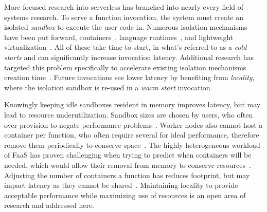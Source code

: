 More focused research into serverless has branched into nearly every field of systems research.
To serve a function invocation, the system must create an isolated \emph{sandbox} to execute the user code in.
Numerous isolation mechanisms have been put forward, containers~\cite{chhatrapati2021towards,docker-main,gvisor}, language runtimes~\cite{shillaker2020faasm,aytekin2019harnessing}, and lightweight virtualization~\cite{firecracker-nsdi20}.
All of these take time to start, in what's referred to as a \textit{cold starts} and can significantly increase invocation latency.
Additional research has targeted this problem specifically to accelerate existing isolation mechanisms creation time~\cite{mohan2019agile,du2020catalyzer,warm2}.
Future invocations see lower latency by benefiting from \emph{locality}, where the isolation sandbox is re-used in a \textit{warm start} invocation.

Knowingly keeping idle sandboxes resident in memory improves latency, but may lead to resource underutilization.
Sandbox sizes are chosen by users, who often over-provision to negate performance problems~\cite{mvondo2021ofc,romero2021faa,eismann2021sizeless,yu2021harvesting,serverless-harvest-sosp21}.
Worker nodes also cannot host a container per function, who often require several for ideal performance, therefore remove them periodically to conserve space~\cite{faascache-asplos21}.
The highly heterogeneous workload of FaaS has proven challenging when trying to predict when containers will be needed, which would allow their removal from memory to conserve resources~\cite{shahrad2020serverless,zhao2021understanding}.
Adjusting the number of containers a function has reduces footprint, but may impact latency as they cannot be shared~\cite{enes2020real,li2022kneescale}.
Maintaining locality to provide acceptable performance while maximizing use of resources is an open area of research and addressed here.

